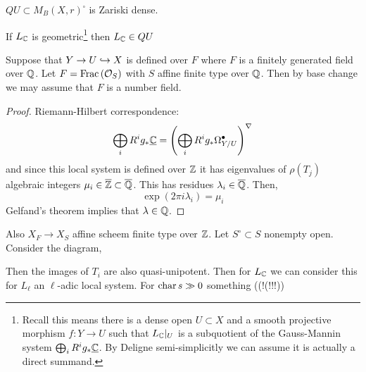 \documentclass[12pt]{article}
\begin{document}
\begin{theorem}[E-M. Kerz, 20] 
$QU \subset M_B(X, r)^{\square}$ is Zariski dense. 
\end{theorem}

\begin{theorem}[Grothendieck]
If $L_{\mathbb{C}}$ is geometric\footnote{Recall this means there is a dense open $U \subset X$ and a smooth projective morphism $f : Y \to U$ such that $L_{\mathbb{C}}|_U$ is a subquotient of the Gauss-Mannin system $\bigoplus_{i} R^i g_* \underline{\mathbb{C}}$. By Deligne semi-simplicitly we can assume it is actually a direct summand.} then $L_{\mathbb{C}} \in QU$
\end{theorem}

\begin{theorem}[Briskorn]
Suppose that $Y \to U \hookrightarrow X$ is defined over $F$ where $F$ is a finitely generated field over $\mathbb{Q}$. Let $F = \mathrm{Frac}\left(\mathcal{O}_{S}\right)$ with $S$ affine finite type over $\mathbb{Q}$. Then by base change we may assume that $F$ is a number field. 
\end{theorem}

\begin{proof}
Riemann-Hilbert correspondence:
\[ \bigoplus_{i} R^i g_* \underline{\mathbb{C}}  = \left( \bigoplus_{i} R^i g_* \Omega^\bullet_{Y/U} \right)^{\nabla} \]
and since this local system is defined over $\mathbb{Z}$ it has eigenvalues of $\rho(T_j)$ algebraic integers $\mu_i \in \overline{\mathbb{Z}} \subset \overline{\mathbb{Q}}$. This has residues $\lambda_i \in \overline{\mathbb{Q}}$. Then,
\[ \exp(2 \pi i \lambda_i) = \mu_i \] 
Gelfand's theorem implies that $\lambda \in \mathbb{Q}$. 
\end{proof}

Also $X_F \to X_S$ affine scheem finite type over $\mathbb{Z}$. Let $S^\circ \subset S$ nonempty open. Consider the diagram,
\begin{center}
\end{center}
Then the images of $T_i$ are also quasi-unipotent. Then for $L_{\mathbb{C}}$ we can consider this for $L_{\ell}$ an $\ell$-adic local system. For $\operatorname{\mathrm{char}}{s} \gg 0$ something ((!(!!!))
\end{document}
